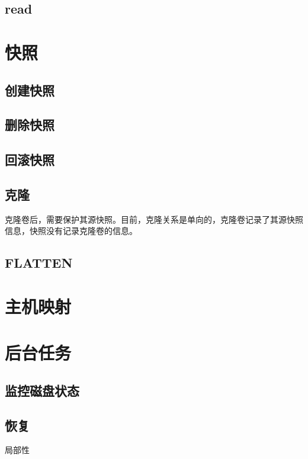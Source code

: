 \subsection{read}

\section{快照}

\subsection{创建快照}

\subsection{删除快照}

\subsection{回滚快照}

\subsection{克隆}

克隆卷后，需要保护其源快照。目前，克隆关系是单向的，克隆卷记录了其源快照信息，快照没有记录克隆卷的信息。

\subsection{FLATTEN}

\section{主机映射}

\section{后台任务}

\subsection{监控磁盘状态}

\subsection{恢复}

局部性

